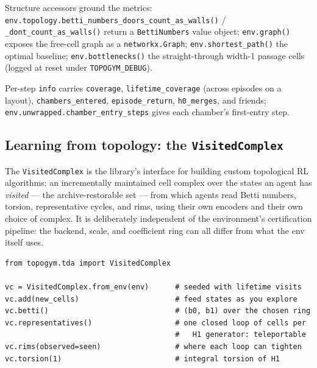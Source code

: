 \documentclass[11pt]{article}
\begin{document}
Structure accessors ground the metrics:
\texttt{env.topology.betti\_numbers\_doors\_count\_as\_walls()} /
\texttt{\_dont\_count\_as\_walls()} return a \texttt{BettiNumbers}
value object; \texttt{env.graph()} exposes the free-cell graph as a
\texttt{networkx.Graph}; \texttt{env.shortest\_path()} the optimal
baseline; \texttt{env.bottlenecks()} the straight-through width-1
passage cells (logged at reset under \texttt{TOPOGYM\_DEBUG}).

Per-step \texttt{info} carries \texttt{coverage},
\texttt{lifetime\_coverage} (across episodes on a layout),
\texttt{chambers\_entered}, \texttt{episode\_return},
\texttt{h0\_merges}, and friends;
\texttt{env.unwrapped.chamber\_entry\_steps} gives each chamber's
first-entry step.

\subsection{Learning from topology: the \texttt{VisitedComplex}}
\label{sec:visited}

The \texttt{VisitedComplex} is the library's interface for building
custom topological RL algorithms: an incrementally maintained cell
complex over the states an agent has \emph{visited} --- the
archive-restorable set --- from which agents read Betti numbers,
torsion, representative cycles, and rims, using their own encoders
and their own choice of complex. It is deliberately independent of
the environment's certification pipeline: the backend, scale, and
coefficient ring can all differ from what the env itself uses.

\begin{lstlisting}
from topogym.tda import VisitedComplex

vc = VisitedComplex.from_env(env)      # seeded with lifetime visits
vc.add(new_cells)                      # feed states as you explore
vc.betti()                             # (b0, b1) over the chosen ring
vc.representatives()                   # one closed loop of cells per
                                       #   H1 generator: teleportable
vc.rims(observed=seen)                 # where each loop can tighten
vc.torsion(1)                          # integral torsion of H1
\end{lstlisting}
\end{document}
